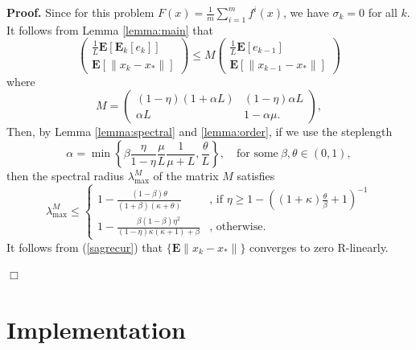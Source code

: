 \documentclass[11pt]{article}
\newcommand{\E}{\mathbf{E}}
\begin{document}
\noindent 
\textbf{Proof.}  Since for this problem $F(x) =  \frac{1}{m} \sum_{i =1}^m f^i(x) $, we have $\sigma_k=0$ for all $k$.
It follows from Lemma \ref{lemma:main} that 
\begin{equation}\label{sagrecur}
 \begin{pmatrix} \frac{1}{L}\E[\E_k[e_k]]\\ \E[\|x_k-x_\ast \|]  \end{pmatrix} 
\leq M
 \begin{pmatrix} \frac{1}{L}\E[e_{k-1}] \\ \E[\| x_{k-1}-x_\ast \|]  \end{pmatrix} 
\end{equation}
where
\begin{equation}\label{M2}
 M = \begin{pmatrix} (1-\eta)(1+\alpha  L)  &   (1-\eta)\alpha L \\  
                   \alpha L  & 1-\alpha \mu  .
                    \end{pmatrix},                   
\end{equation}
Then, by Lemma \ref{lemma:spectral} and \ref{lemma:order}, if we use the  steplength
 \begin{equation}\label{alphasag}
    \alpha = \min\left\lbrace\beta\frac{\eta}{1-\eta}\frac{\mu}{L}\frac{1}{\mu+L},\frac{\theta}{L}\right\rbrace, \quad \mbox{for some} \ \beta,\theta\in(0,1),
 \end{equation}
then the spectral radius $\lambda^M_{\max}$ of the matrix $M$  satisfies
  \begin{equation}\label{sagspec}
  \lambda^M_{\max} \leq
  \begin{cases}
    1-\displaystyle\frac{(1-\beta)\theta}{(1+\beta)(\kappa+\theta)} & \mbox{, if }\eta \geq 1-\left((1+\kappa)\frac{\theta}{\beta} + 1\right)^{-1}\\
    1-\displaystyle\frac{\beta(1-\beta)\eta^2}{(1-\eta)\kappa(\kappa+1)+\beta} & \mbox{, otherwise. }
  \end{cases}
   \end{equation}
  It follows from (\ref{sagrecur}) that $\{\E\|x_k-x_\ast\|\}$  converges to zero R-linearly.
  
  \hspace*{\fill}$\Box$\medskip




 \section{Implementation}  \label{implementation}
 
\end{document}
